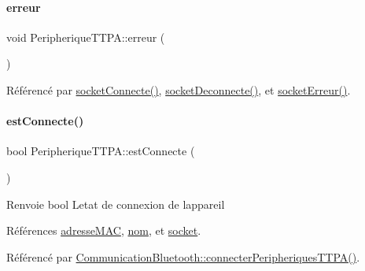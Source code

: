 \paragraph{\texorpdfstring{erreur}{erreur}}
{\footnotesize\ttfamily void Peripherique\+T\+T\+P\+A\+::erreur (\begin{DoxyParamCaption}{ }\end{DoxyParamCaption})\hspace{0.3cm}{\ttfamily [signal]}}



Référencé par \hyperlink{class_peripherique_t_t_p_a_aab23a43f5c9d70c30df3dbf4aeeeff9d}{socket\+Connecte()}, \hyperlink{class_peripherique_t_t_p_a_adb04c45864ea56a80a0716cde0a31856}{socket\+Deconnecte()}, et \hyperlink{class_peripherique_t_t_p_a_a85811ace874ff7cea3437146511f1b2c}{socket\+Erreur()}.

\mbox{\label{class_peripherique_t_t_p_a_a33991b646ef2a49e79bac478b5f722c7}} 
\paragraph{\texorpdfstring{est\+Connecte()}{estConnecte()}}
{\footnotesize\ttfamily bool Peripherique\+T\+T\+P\+A\+::est\+Connecte (\begin{DoxyParamCaption}{ }\end{DoxyParamCaption})}

\begin{DoxyReturn}{Renvoie}
bool L\textquotesingle{}etat de connexion de l\textquotesingle{}appareil 
\end{DoxyReturn}


Références \hyperlink{class_peripherique_t_t_p_a_a444063230c83cf81eff8a3a55736f2cf}{adresse\+M\+AC}, \hyperlink{class_peripherique_t_t_p_a_afafe3566b4b5357819811218b9a4244f}{nom}, et \hyperlink{class_peripherique_t_t_p_a_ab66f30984a7f9fa17fd28391efe968a9}{socket}.



Référencé par \hyperlink{class_communication_bluetooth_a321073d9dc26aad4b34ecf41a1dee8a4}{Communication\+Bluetooth\+::connecter\+Peripheriques\+T\+T\+P\+A()}.


